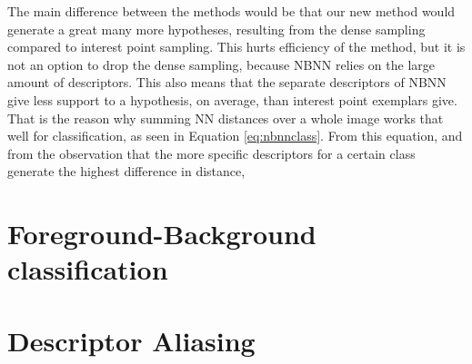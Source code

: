 The main difference between the methods would be that our new method would generate a great many more hypotheses, resulting from the dense sampling compared to interest point sampling. This hurts efficiency of the method, but it is not an option to drop the dense sampling, because NBNN relies on the large amount of descriptors. This also means that the separate descriptors of NBNN give less support to a hypothesis, on average, than interest point exemplars give. That is the reason why summing NN distances over a whole image works that well for classification, as seen in Equation \eqref{eq:nbnnclass}. From this equation, and from the observation that the more specific descriptors for a certain class generate the highest difference in distance, 




\section{Foreground-Background classification} %
\label{sec:foreground_background_classification}

\section{Descriptor Aliasing} %
\label{sub:descriptor_aliasing}

